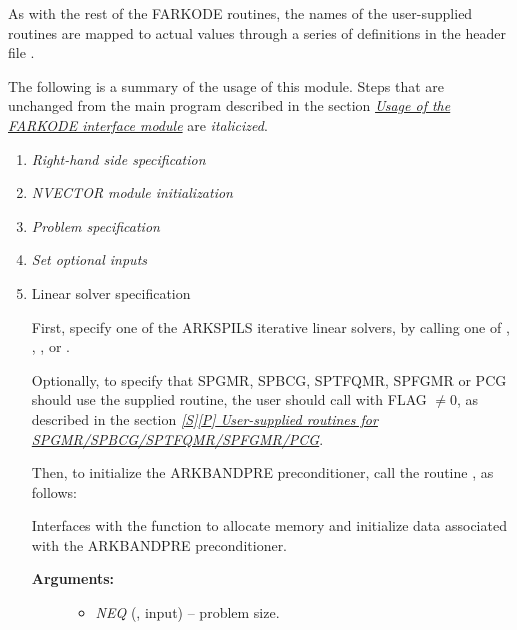\documentclass[letterpaper,10pt,english]{sphinxmanual}
\begin{document}
As with the rest of the FARKODE routines, the names of the
user-supplied routines are mapped to actual values through a series of
definitions in the header file .

The following is a summary of the usage of this module.  Steps that
are unchanged from the main program described in the section
{\hyperref[f_interface/Usage:finterface-usage]{\emph{Usage of the FARKODE interface module}}} are \emph{italicized}.
\begin{enumerate}
\item {} 
\emph{Right-hand side specification}

\item {} 
\emph{NVECTOR module initialization}

\item {} 
\emph{Problem specification}

\item {} 
\emph{Set optional inputs}

\item {} 
Linear solver specification

First, specify one of the ARKSPILS iterative linear solvers, by
calling one of {\hyperref[f_interface/Usage:f/_/FARKSPGMR]{}}, {\hyperref[f_interface/Usage:f/_/FARKSPBCG]{}},
{\hyperref[f_interface/Usage:f/_/FARKSPTFQMR]{}}, {\hyperref[f_interface/Usage:f/_/FARKSPFGMR]{}} or
{\hyperref[f_interface/Usage:f/_/FARKPCG]{}}.

Optionally, to specify that SPGMR, SPBCG, SPTFQMR, SPFGMR or PCG
should use the supplied {\hyperref[f_interface/Usage:f/_/FARKJTIMES]{}} routine, the user
should call {\hyperref[f_interface/Usage:f/_/FARKSPILSSETJAC]{}} with FLAG $\ne 0$,
as described in the section {\hyperref[f_interface/Usage:finterface-spilsusersupplied]{\emph{{[}S{]}{[}P{]} User-supplied routines for SPGMR/SPBCG/SPTFQMR/SPFGMR/PCG}}}.

Then, to initialize the ARKBANDPRE preconditioner, call the
routine {\hyperref[f_interface/Preconditioning:f/_/FARKBPINIT]{}}, as follows:

\begin{fulllineitems}
\label{f_interface/Preconditioning:f/_/FARKBPINIT}
Interfaces with the {\hyperref[c_interface/Preconditioners:ARKBandPrecInit]{}}
function to allocate memory and initialize data associated
with the ARKBANDPRE preconditioner.
\begin{description}
\item[{\textbf{Arguments:}}] \leavevmode\begin{itemize}
\item {} 
\emph{NEQ} (, input) -- problem size.


\end{itemize}
\end{description}
\end{fulllineitems}
\end{enumerate}
\end{document}
